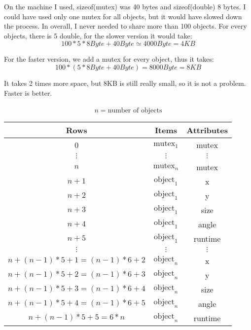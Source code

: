 On the machine I used, sizeof(mutex) was 40 bytes and sizeof(double) 8 
bytes. I could have used only one mutex for all objects, but it would 
have slowed down the process. In overall, I never needed to share more 
than 100 objects. For every objects, there is 5 double, for the slower 
version it would take:
\begin{displaymath}
                100 * 5 * 8Byte +40Byte \simeq 4000 Byte = 4 KB 
\end{displaymath}

For the faster version, we add a mutex for every object, thus it takes:
\begin{displaymath}
                        100 * (5*8Byte +40Byte) = 8000Byte = 8KB
\end{displaymath}

It takes 2 times more space, but 8KB is still really small, so it is 
not a problem. Faster is better.
\\
\\
\begin{displaymath}
    n = \mbox{number of objects}
\end{displaymath}
\begin{center}
\begin{tabular}{c|c|c}
\label{tab:mosm:ms}
   {\bf Rows }      & {\bf Items }  & {\bf Attributes} \\ \hline
   0                & $\mbox{mutex}_1$  & mutex \\ \hline
   $\vdots$         & $\vdots$          & $\vdots$      \\ \hline  
   $n$              & $\mbox{mutex}_n$  & mutex \\ \hline
   $n+1$            & $\mbox{object}_1$ & x \\ \hline
   $n+2$            & $\mbox{object}_1$ & y \\ \hline
   $n+3$            & $\mbox{object}_1$ & size \\ \hline 
   $n+4$            & $\mbox{object}_1$ & angle \\ \hline
   $n+5$            & $\mbox{object}_1$ & runtime \\ \hline
   $\vdots$         & $\vdots$ & $\vdots$ \\ \hline
   $n + (n-1)*5 +1 = (n-1)*6+2 $ & $\mbox{object}_n$ & x \\ \hline
   $n + (n-1)*5 +2 = (n-1)*6+3$ & $\mbox{object}_n$ & y \\ \hline
   $n + (n-1)*5 +3 = (n-1)*6+4$ & $\mbox{object}_n$ & size \\ \hline 
   $n + (n-1)*5 +4 = (n-1)*6+5$ & $\mbox{object}_n$ & angle \\ \hline
   $n + (n-1)*5 +5 = 6*n$ & $\mbox{object}_n$ & runtime
\end{tabular}
\end{center}

